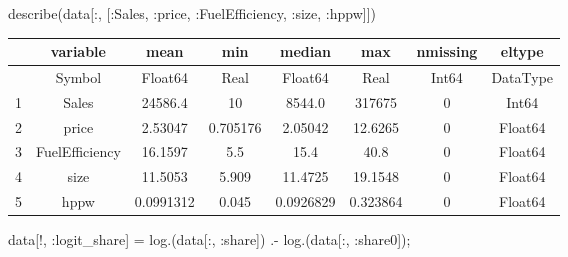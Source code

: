 \documentclass[
  letterpaper,
  DIV=11,
  numbers=noendperiod]{scrreprt}
\newenvironment{Shaded}{\begin{snugshade}}{\end{snugshade}}
\newcommand{\FunctionTok}[1]{\textcolor[rgb]{0.28,0.35,0.67}{#1}}
\newcommand{\NormalTok}[1]{\textcolor[rgb]{0.00,0.23,0.31}{#1}}
\newcommand{\OperatorTok}[1]{\textcolor[rgb]{0.37,0.37,0.37}{#1}}
\begin{document}
\begin{Shaded}
\begin{Highlighting}[]
\FunctionTok{describe}\NormalTok{(data[}\OperatorTok{:}\NormalTok{, [}\OperatorTok{:}\NormalTok{Sales, }\OperatorTok{:}\NormalTok{price, }\OperatorTok{:}\NormalTok{FuelEfficiency, }\OperatorTok{:}\NormalTok{size, }\OperatorTok{:}\NormalTok{hppw]])}
\end{Highlighting}
\end{Shaded}

\begin{tabular}{r|ccccccc}
    & variable & mean & min & median & max & nmissing & eltype\\
    \hline
    & Symbol & Float64 & Real & Float64 & Real & Int64 & DataType\\
    \hline
    1 & Sales & 24586.4 & 10 & 8544.0 & 317675 & 0 & Int64 \\
    2 & price & 2.53047 & 0.705176 & 2.05042 & 12.6265 & 0 & Float64 \\
    3 & FuelEfficiency & 16.1597 & 5.5 & 15.4 & 40.8 & 0 & Float64 \\
    4 & size & 11.5053 & 5.909 & 11.4725 & 19.1548 & 0 & Float64 \\
    5 & hppw & 0.0991312 & 0.045 & 0.0926829 & 0.323864 & 0 & Float64 \\
\end{tabular}

\begin{Shaded}
\begin{Highlighting}[]
\NormalTok{data[!, }\OperatorTok{:}\NormalTok{logit\_share] }\OperatorTok{=} \FunctionTok{log}\NormalTok{.(data[}\OperatorTok{:}\NormalTok{, }\OperatorTok{:}\NormalTok{share]) }\OperatorTok{.{-}} \FunctionTok{log}\NormalTok{.(data[}\OperatorTok{:}\NormalTok{, }\OperatorTok{:}\NormalTok{share0]);}
\end{Highlighting}
\end{Shaded}
\end{document}
